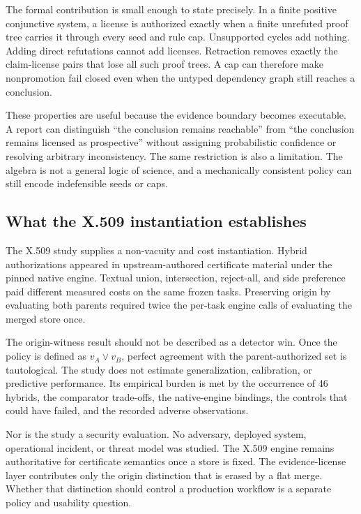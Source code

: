 \documentclass[pdflatex,sn-mathphys-num]{sn-jnl}
\begin{document}
The formal contribution is small enough to state precisely. In a finite positive conjunctive system, a license is authorized exactly when a finite unrefuted proof tree carries it through every seed and rule cap. Unsupported cycles add nothing. Adding direct refutations cannot add licenses. Retraction removes exactly the claim-license pairs that lose all such proof trees. A cap can therefore make nonpromotion fail closed even when the untyped dependency graph still reaches a conclusion.

These properties are useful because the evidence boundary becomes executable. A report can distinguish ``the conclusion remains reachable'' from ``the conclusion remains licensed as prospective'' without assigning probabilistic confidence or resolving arbitrary inconsistency. The same restriction is also a limitation. The algebra is not a general logic of science, and a mechanically consistent policy can still encode indefensible seeds or caps.

\subsection{What the X.509 instantiation establishes}\label{what-the-x.509-instantiation-establishes}

The X.509 study supplies a non-vacuity and cost instantiation. Hybrid authorizations appeared in upstream-authored certificate material under the pinned native engine. Textual union, intersection, reject-all, and side preference paid different measured costs on the same frozen tasks. Preserving origin by evaluating both parents required twice the per-task engine calls of evaluating the merged store once.

The origin-witness result should not be described as a detector win. Once the policy is defined as \(v_A\lor v_B\), perfect agreement with the parent-authorized set is tautological. The study does not estimate generalization, calibration, or predictive performance. Its empirical burden is met by the occurrence of 46 hybrids, the comparator trade-offs, the native-engine bindings, the controls that could have failed, and the recorded adverse observations.

Nor is the study a security evaluation. No adversary, deployed system, operational incident, or threat model was studied. The X.509 engine remains authoritative for certificate semantics once a store is fixed. The evidence-license layer contributes only the origin distinction that is erased by a flat merge. Whether that distinction should control a production workflow is a separate policy and usability question.
\end{document}
